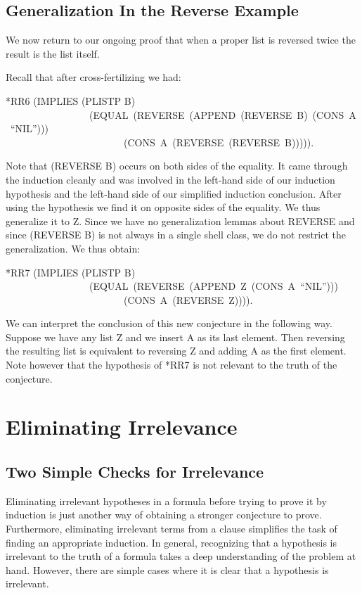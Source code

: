 \documentclass[10pt]{book}
\newenvironment{pubasis}{\begin{flushleft}}{\end{flushleft}}
\begin{document}
\section{Generalization In the Reverse Example}
We now return to our ongoing proof that when a
proper list is reversed twice the result is the list itself.

Recall that after cross-fertilizing we had:

\begin{pubasis}
*RR6	(IMPLIES (PLISTP B)\\
~~~~~~~~~~~~~~~~~(EQUAL~(REVERSE~(APPEND~(REVERSE~B)~(CONS~A~``NIL'')))\\
~~~~~~~~~~~~~~~~~~~~~~~~(CONS~A~(REVERSE~(REVERSE~B))))).\\
\end{pubasis}
Note that (REVERSE B) occurs on both sides of the equality.
It came through the induction cleanly and was involved
in the left-hand side of our induction hypothesis and the left-hand side	
of our simplified induction conclusion.  After using the hypothesis we
find it on opposite sides of the equality.  We thus generalize it
to Z.  
Since we have no generalization lemmas about REVERSE and
since (REVERSE B) is not always in a single shell class, we do not
restrict the generalization.  We thus obtain:

\begin{pubasis}
*RR7	(IMPLIES (PLISTP B)\\
~~~~~~~~~~~~~~~~~(EQUAL~(REVERSE~(APPEND~Z~(CONS~A~``NIL'')))\\
~~~~~~~~~~~~~~~~~~~~~~~~(CONS~A~(REVERSE~Z)))).\\
\end{pubasis}
We can interpret the conclusion of this new conjecture in
the following way.
Suppose we have any list Z and we insert A as its last element.
Then reversing the resulting list is equivalent to reversing Z
and adding A as the first element.  Note however that the hypothesis
of *RR7 is not relevant to the truth of the conjecture.

\chapter{Eliminating Irrelevance}
\pagestyle{headings}
\label{SECIRRELEVANCE}
\section{Two Simple Checks for Irrelevance}
Eliminating irrelevant hypotheses in a formula before trying to
prove it by induction is just another way
of obtaining a stronger  conjecture to prove.
Furthermore, eliminating irrelevant
terms from a clause simplifies the task of
finding an appropriate induction.
In general, recognizing that a hypothesis is irrelevant
to the truth of a formula takes a deep understanding of the problem
at hand.  However, there are simple cases where it is clear that
a hypothesis is irrelevant.
\end{document}
